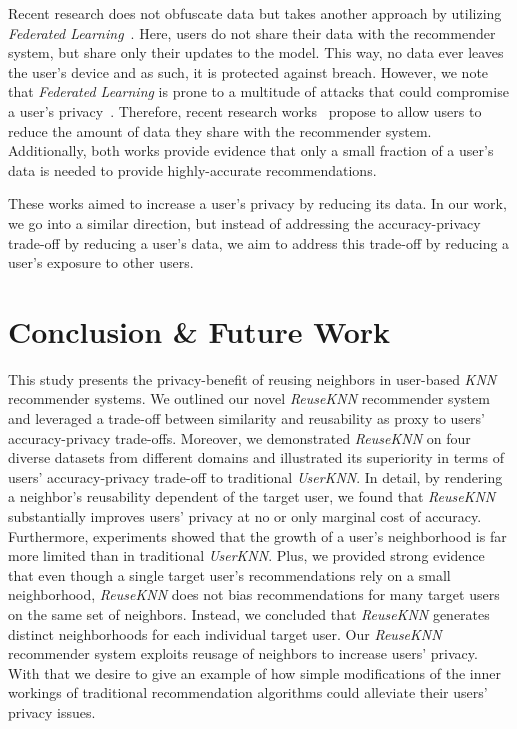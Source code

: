 \documentclass[manuscript,review,anonymous]{acmart}
\begin{document}
Recent research does not obfuscate data but takes another approach by utilizing \emph{Federated Learning}~\cite{ammad2019federated,chen2018federated}.
Here, users do not share their data with the recommender system, but share only their updates to the model.
This way, no data ever leaves the user's device and as such, it is protected against breach.
However, we note that \emph{Federated Learning} is prone to a multitude of attacks that could compromise a user's privacy~\cite{nasr2019comprehensive}.
Therefore, recent research works~\cite{anelli2021put,robustnessofmetamf} propose to allow users to reduce the amount of data they share with the recommender system.
Additionally, both works provide evidence that only a small fraction of a user's data is needed to provide highly-accurate recommendations.

These works aimed to increase a user's privacy by reducing its data.
In our work, we go into a similar direction, but instead of addressing the accuracy-privacy trade-off by reducing a user's data, we aim to address this trade-off by reducing a user's exposure to other users.



\section{Conclusion \& Future Work}
This study presents the privacy-benefit of reusing neighbors in user-based \emph{KNN} recommender systems.
We outlined our novel \emph{ReuseKNN} recommender system and leveraged a trade-off between similarity and reusability as proxy to users' accuracy-privacy trade-offs.
Moreover, we demonstrated \emph{ReuseKNN} on four diverse datasets from different domains and illustrated its superiority in terms of users' accuracy-privacy trade-off to traditional \emph{UserKNN}.
In detail, by rendering a neighbor's reusability dependent of the target user, we found that \emph{ReuseKNN} substantially improves users' privacy at no or only marginal cost of accuracy.
Furthermore, experiments showed that the growth of a user's neighborhood is far more limited than in traditional \emph{UserKNN}.
Plus, we provided strong evidence that even though a single target user's recommendations rely on a small neighborhood, \emph{ReuseKNN} does not bias recommendations for many target users on the same set of neighbors.
Instead, we concluded that \emph{ReuseKNN} generates distinct neighborhoods for each individual target user.
Our \emph{ReuseKNN} recommender system exploits reusage of neighbors to increase users' privacy.
With that we desire to give an example of how simple modifications of the inner workings of traditional recommendation algorithms could alleviate their users' privacy issues.
\end{document}
